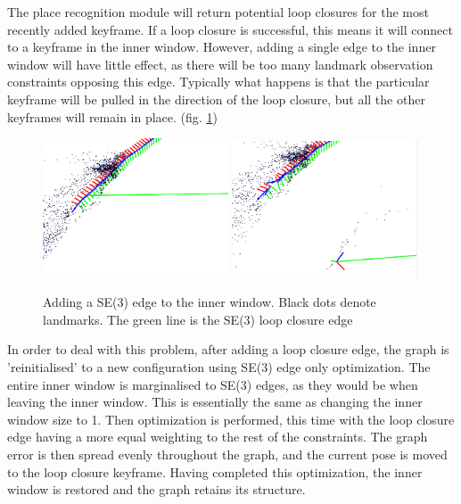 The place recognition module will return potential loop closures for the most recently added keyframe.  If a loop closure is successful, this means it will connect to a keyframe in the inner window.  However, adding a single edge to the inner window will have little effect, as there will be too many landmark observation constraints opposing this edge.  Typically what happens is that the particular keyframe will be pulled in the direction of the loop closure, but all the other keyframes will remain in place. (fig. \ref{fig:graph_fail})

\begin{figure}[h]
  \centering
    \includegraphics[width=0.49\textwidth]{chapters/images/before_opt}
    \includegraphics[width=0.49\textwidth]{chapters/images/after_opt}
  \caption{Adding a SE(3) edge to the inner window.  Black dots denote landmarks.  The green line is the SE(3) loop closure edge}
  \label{fig:graph_fail}
\end{figure}

In order to deal with this problem, after adding a loop closure edge, the graph is 'reinitialised' to a new configuration using SE(3) edge only optimization.  The entire inner window is marginalised to SE(3) edges, as they would be when leaving the inner window.  This is essentially the same as changing the inner window size to 1.  Then optimization is performed, this time with the loop closure edge having a more equal weighting to the rest of the constraints.  The graph error is then spread evenly throughout the graph, and the current pose is moved to the loop closure keyframe.  Having completed this optimization, the inner window is restored and the graph retains its structure.


